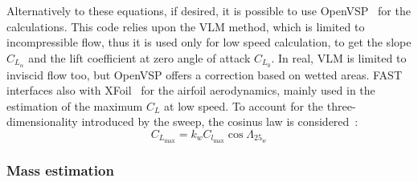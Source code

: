 Alternatively to these equations, if desired, it is possible to use OpenVSP~\cite{bib:openvsp} for the calculations.
This code relies upon the VLM method, which is limited to incompressible flow, thus it is used only for low speed calculation, to get the slope $C_{L_{\alpha}}$ and the lift coefficient at zero angle of attack $C_{L_{0}}$. 
In real, VLM is limited to inviscid flow too, but OpenVSP offers a correction based on wetted areas.
FAST interfaces also with XFoil~\cite{bib:xfoil} for the airfoil aerodynamics, mainly used in the estimation of the maximum $C_L$ at low speed. 
To account for the three-dimensionality introduced by the sweep, the cosinus law is considered~\cite{bib:abbott, bib:cdn_notes, bib:anderson_aero}:
\begin{equation}
\label{eq:cl_max_3d}
C_{L_{\max}} = k_{w}C_{l_{\max}}\cos\Lambda_{25_{w}}
\end{equation}

\subsubsection{Mass estimation}
\label{subsubsec:chap2_fast_mass}

